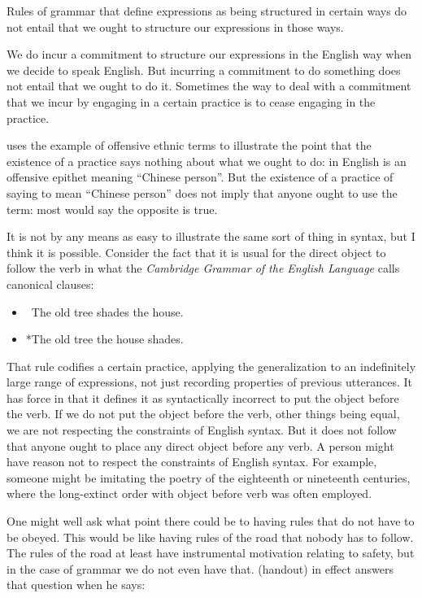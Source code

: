 \documentclass[output=paper]{langscibook}
\begin{document}
Rules of grammar that define expressions as being structured in certain ways do not entail that we ought to structure our expressions in those ways.

We do incur a commitment to structure our expressions in the English way when we decide to speak English.  But incurring a commitment to do something does not entail that we ought to do it.  Sometimes the way to deal with a commitment that we incur by engaging in a certain practice is to cease engaging in the practice.

{\Millar} uses the example of offensive ethnic terms to illustrate the point that the existence of a practice says nothing about what we ought to do:  in English is an offensive epithet meaning ``Chinese person''. But the existence of a practice of saying  to mean ``Chinese person'' does not imply that anyone ought to use the term: most would say the opposite is true.

It is not by any means as easy to illustrate the same sort of thing in syntax, but I think it is possible.  Consider the fact that it is usual for the direct object to follow the verb in what the \emph{Cambridge Grammar of the English Language} \citep{HuddlestonePullum2008} calls canonical clauses:

\begin{itemize}  
\item[] ~The old tree shades the house.  
\item[] *The old tree the house shades. 
\end{itemize} 

That rule codifies a certain practice, applying the generalization to an indefinitely large range of expressions, not just recording properties of previous utterances.  It has  force in that it defines it as syntactically incorrect to put the object before the verb.  If we do not put the object before the verb, other things being equal, we are not respecting the constraints of English syntax.  But it does not follow that anyone ought to place any direct object before any verb.  A person might have reason not to respect the constraints of English syntax.  For example, someone might be imitating the poetry of the eighteenth or nineteenth centuries, where the long-extinct order with object before verb was often employed.

One might well ask what point there could be to having rules that do not have to be obeyed.  This would be like having rules of the road that nobody has to follow.  The rules of the road at least have instrumental motivation relating to safety, but in the case of grammar we do not even have that.  {\Millar} (handout) in effect answers that question when he says:
\end{document}
